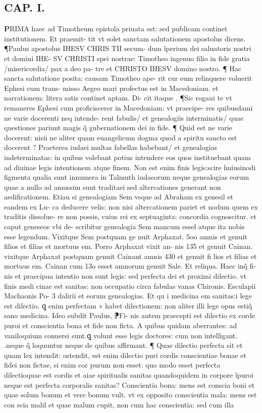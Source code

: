 \documentclass{article}
\begin{document}
\begin{pages}
\endnumbering\beginnumbering\section{CAP. I.}\pstart \huge\textbf{P}\normalsize RIMA haec ad Timotheum epistola priuata est: sed publicam continet institutionem. Et praemit- tit vt solet sanctam salutationem apostolus dicens. ¶Paulus apostolus IHESV CHRIS TII secum- dum ĩperium dei saluatoris nostri et domini IHE- SV CHRISTI spei nostrae: Timotheo ingenuo filio in fide gratia /misericordia/ pax a deo pa- tre et CHRISTO IHESV domino nostro. ¶ Hac sancta salutatione posita: causam Timotheo ape- rit cur eum relinquere voluerit Ephesi cum trans- misso Aegeo mari profectus est in Macedoniam. et narrationem: litera satis continet aptam. Di- cit itaque . ¶Sic rogaui te vt remaneres Ephesi cum proficiscerer in Macedoniam: vt praecipe- res quibusdami ne varie docerenti neq intende- rent fabulis/ et genealogiis interminatis/ quae questiones pariunt magis q̃ gubernationem dei in fide. ¶ Quid est ne varie docerent: nisii ne aliter quam euangelicum dogma quod a spiritu sancto est docerent ? Praeterea iudaei multas fabellas habebant/ et genealogias indeterminatas: in quibus volebant potius intendere eos quos instituebant quam ad diuinae legis intentionem atque finem. Non est enim finis legis:scire huiusinodi figmenta qualia sunt innumera in Talmuth iudaeorum neque  genealogias eorum quae a nullo ad amussim sunt traditaei sed altercationes generant non aedificationem. Etiau si genealogiam Sem vsque ad Abraham ex genesil et eandem ex Lu- ca deducere velis: non nisi altercationem pariet et nodum quem ex traditis dissolue- re non possis, cuius rei ex septuaginta: concordia cognoscitur. et caput geneseos vbi de- scribitur genealogia Sem mancum essel atque ita nobis esse legendum. Vixitque Sem postquam ge nuit Arphaxat. 5oo amnis et genuit filios et filias et mortuus em. Porro Arphaxat vixit an- nis 135 et genuit Cainan. vixitque Arphaxat postquam genuit Cainant amnis 430 et genuit fi lios et filias et mortuus em. Cainan cum 13o esset amnorum genuit Sale. Et reliqua. Haec inq̃ fi- nis et praecipua intentio non sunt legis: sed perfecta dei et proximi dilectio. vt finis medi cinae est sanitas: non occupatio circa fabulas vanas Chironis. Esculapii Machaonis Po- 3 dalirii et eorum genealogias. Et qu i medicina em sanitas:i lege est dilectio. ꝗ enim perfectam » habet dilectionem: non aliter illi lege opus estiq̃ sano medicina. Ideo subdit Paulus, ⁋Fi- nis autem praecepti est dilectio ex corde puroi et conscientia bona et fide non ficta. A quibus quidam aberrantes: ad vaniloquium conuersi sunt.ꝗ volunt esse legis doctores: cum non intelligant. .neque q̃ loquuntur neque de quibus affirmant. ¶ Quae dilectio perfecta sit et quam lex intendit: ostendit, est enim dilectio puri cordis conscientiae bonae et fidei non fictae, si enim cor purum non esset: quo modo esset perfecta dilectioquae est cordis et aiae spiritualis sanitas quandoquidem in corpore ĩpuroi neque est perfecta corporalis sanitas? Conscientia bona: mens est conscia boni et quae solum bonum et vere bonum vult. vt ex opposito conscientia mala: mens est con scia malil et quae malum cupit, non cum hac conscientia: sed cum illa 
\end{pages}
\end{document}
